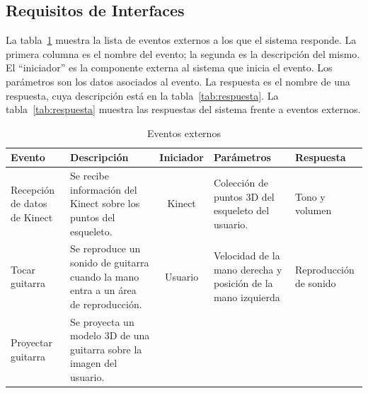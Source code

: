 \documentclass[a4paper,12pt]{article}
\begin{document}
\subsection{Requisitos de Interfaces}
La tabla~\ref{tab:event} muestra la lista de eventos externos a los que el sistema responde.
La primera columna es el nombre del evento; la segunda es la descripción del
mismo. El “iniciador” es la componente externa al sistema que inicia el evento.
Los parámetros son los datos asociados al evento. La respuesta es el nombre de
una respuesta, cuya descripción está en la tabla~\ref{tab:respuesta}.
La tabla~\ref{tab:respuesta} muestra las respuestas del sistema frente a eventos externos.
\begin{table}[hb]
        \centering
        \begin{tabular}{|p{2cm}|p{4cm}|c|p{3cm}|p{25mm}|}
                \hline
                \textbf{Evento} & \textbf{Descripción} & \textbf{Iniciador} &
                \textbf{Parámetros} & \textbf{Respuesta} \\
                \hline
                Recepción de datos de Kinect & Se recibe información del
                Kinect sobre los puntos del esqueleto. & Kinect & Colección
                de puntos 3D del esqueleto del usuario. & Tono y volumen \\
                \hline
                Tocar guitarra & Se reproduce un sonido de guitarra cuando la
                mano entra a un área de reproducción. & Usuario & Velocidad de
                la mano derecha y posición de la mano izquierda & Reproducción
                de sonido \\
                \hline
                Proyectar guitarra & Se proyecta un modelo 3D de una guitarra sobre la imagen del usuario. \\
                \hline
        \end{tabular}
        \caption{Eventos externos}
        \label{tab:event}
\end{table}
\end{document}
